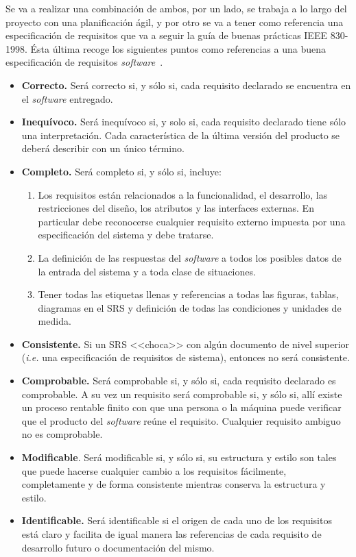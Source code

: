 Se va a realizar una combinación de ambos, por un lado, se trabaja a lo largo del proyecto con una planificación ágil, y por otro se va a tener como referencia una especificación de requisitos que va a seguir la guía de buenas prácticas IEEE 830-1998. Ésta última recoge los siguientes puntos como referencias a una buena especificación de requisitos \textit{software}~\cite{ingenieriasoftwareytiemporeal_2020}.
\begin{itemize}
\item \textbf{Correcto.} Será correcto si, y sólo si, cada requisito declarado se encuentra en el \textit{software} entregado.
\item \textbf{Inequívoco.} Será inequívoco si, y solo si, cada requisito declarado tiene sólo una interpretación. Cada característica de la última versión del producto se deberá describir con un único término.
\item \textbf{Completo.} Será completo si, y sólo si, incluye:
\begin{enumerate}
\item Los requisitos están relacionados a la funcionalidad, el desarrollo, las restricciones del diseño, los atributos y las interfaces externas. En particular debe reconocerse cualquier requisito externo impuesta por una especificación del sistema y debe tratarse.
\item La definición de las respuestas del \textit{software} a todos los posibles datos de la entrada del sistema y a toda clase de situaciones.
\item Tener todas las etiquetas llenas y referencias a todas las figuras, tablas, diagramas en el SRS y definición de todas las condiciones y unidades de medida.
\end{enumerate}
\item \textbf{Consistente.} Si un SRS <<choca>> con algún documento de nivel superior (\textit{i.e.} una especificación de requisitos de sistema), entonces no será consistente.
\item \textbf{Comprobable.} Será comprobable si, y sólo si, cada requisito declarado es comprobable. A su vez un requisito será comprobable si, y sólo si, allí existe un proceso rentable finito con que una persona o la máquina puede verificar que el producto del \textit{software} reúne el requisito. Cualquier requisito ambiguo no es comprobable.
\item \textbf{Modificable}. Será modificable si, y sólo si, su estructura y estilo son tales que puede hacerse cualquier cambio a los requisitos fácilmente, completamente y de forma consistente mientras conserva la estructura y estilo.
\item \textbf{Identificable.} Será identificable si el origen de cada uno de los requisitos está claro y facilita de igual manera las referencias de cada requisito de desarrollo futuro o documentación del mismo.
\end{itemize}


